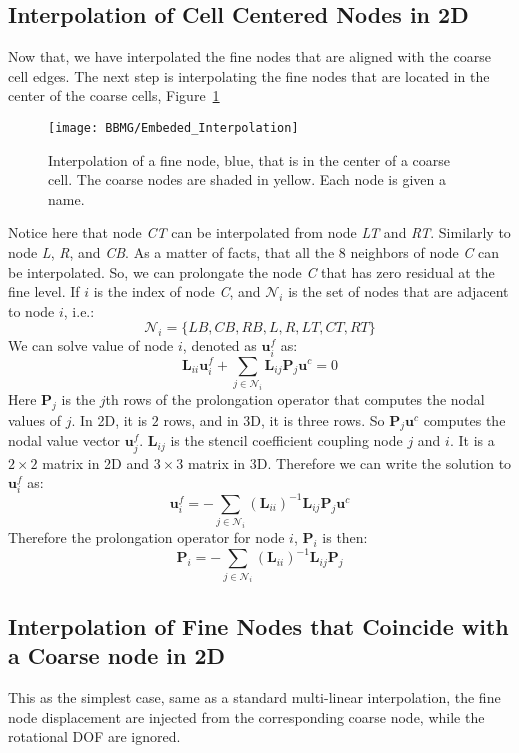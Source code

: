 \subsection{Interpolation of Cell Centered Nodes in 2D}
Now that, we have interpolated the fine nodes that are aligned with the coarse cell edges. The next step is interpolating the fine nodes that are located in the center of the coarse cells, Figure~\ref{fig:embedded_interpolation}
\begin{figure}[t]
\texttt{[image: BBMG/Embeded\_Interpolation]}
\centering
\caption{Interpolation of a fine node, blue, that is in the center of a coarse cell. The coarse nodes are shaded in yellow. Each node is given a name.}
\label{fig:embedded_interpolation}
\end{figure}
Notice here that node \textit{CT} can be interpolated from node \textit{LT} and \textit{RT}. Similarly to node \textit{L},  \textit{R}, and \textit{CB}. As a matter of facts, that all the 8 neighbors of node \textit{C} can be interpolated. So, we can prolongate the node \textit{C} that has zero residual at the fine level. If $i$ is the index of node \textit{C}, and $\mathcal{N}_i$ is the set of nodes that are adjacent to node $i$, i.e.:
$$
\mathcal{N}_i = \{\textit{LB},\textit{CB},\textit{RB},\textit{L},\textit{R},\textit{LT},\textit{CT},\textit{RT}\}
$$
We can solve value of node $i$, denoted as $\mathbf{u}^f_i$ as:
\begin{equation}
\mathbf{L}_{ii}\mathbf{u}^f_i + \sum_{j \in \mathcal{N}_i}\mathbf{L}_{ij}\mathbf{P}_j\mathbf{u}^c = 0 
\end{equation}
Here $\mathbf{P}_j$ is the $j$th rows of the prolongation operator that computes the nodal values of $j$. In 2D, it is $2$ rows, and in 3D, it is three rows. So $\mathbf{P}_j\mathbf{u}^c$ computes the nodal value vector $\mathbf{u}^f_j$. $\mathbf{L}_{ij}$ is the stencil coefficient coupling node $j$ and $i$. It is a $2 \times 2$ matrix in 2D and $3 \times 3$ matrix in 3D. Therefore we can write the solution to $\mathbf{u}^f_i$ as:
\begin{equation}
\mathbf{u}^f_i = -\sum_{j \in \mathcal{N}_i}(\mathbf{L}_{ii})^{-1}\mathbf{L}_{ij}\mathbf{P}_j\mathbf{u}^c
\end{equation}
Therefore the prolongation operator for node $i$, $\mathbf{P}_i$ is then:
\begin{equation}
\mathbf{P}_i = -\sum_{j \in \mathcal{N}_i}(\mathbf{L}_{ii})^{-1}\mathbf{L}_{ij}\mathbf{P}_j
\label{equ:p_cell_center}
\end{equation}
\subsection{Interpolation of Fine Nodes that Coincide with a Coarse node in 2D}
This as the simplest case, same as a standard multi-linear interpolation, the fine node displacement are injected from the corresponding coarse node, while the rotational DOF are ignored.